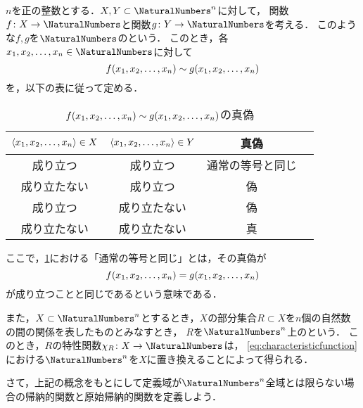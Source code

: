 \begin{Def} \label{Def:partialequal}
	\(n\)を正の整数とする．\(X, Y \subset \NaturalNumbers^n\)に対して，
	関数\(f \colon X \to \NaturalNumbers\)と関数\(g \colon Y \to \NaturalNumbers\)を考える．
	このような\(f, g\)を\(\NaturalNumbers\)のという．
	このとき，各\(x_1, x_2, \dots, x_n \in \NaturalNumbers\)に対して
	\begin{equation}
		\apply{f}{x_1, x_2, \dots, x_n} \partialequal \apply{g}{x_1, x_2, \dots, x_n}
		\label{eq:partialequal}
	\end{equation}
	を，以下の表に従って定める．

	\begin{table}[htbp]
		\centering
		\caption{\(\apply{f}{x_1, x_2, \dots, x_n} \partialequal \apply{g}{x_1, x_2, \dots, x_n}\)の真偽}
		\label{tab:partialequal}
		\begin{tabular}{cccc}
			\toprule
			\(\langle x_1, x_2, \dots, x_n \rangle \in X\) &
			\(\langle x_1, x_2, \dots, x_n \rangle \in Y\) &
			真偽                                                        \\
			\midrule
			成り立つ                                  & 成り立つ   & 通常の等号と同じ \\
			成り立たない                                & 成り立つ   & 偽        \\
			成り立つ                                  & 成り立たない & 偽        \\
			成り立たない                                & 成り立たない & 真        \\
			\bottomrule
		\end{tabular}
	\end{table}

	ここで，\cref{tab:partialequal}における「通常の等号と同じ」とは，その真偽が
	\[
		\apply{f}{x_1, x_2, \dots, x_n} = \apply{g}{x_1, x_2, \dots, x_n}
	\]
	が成り立つことと同じであるという意味である．

	また，\(X \subset \NaturalNumbers^n\)とするとき，\(X\)の部分集合\(R \subset X\)を\(n\)個の自然数の間の関係を表したものとみなすとき，
	\(R\)を\(\NaturalNumbers^n\)上のという．
	このとき，\(R\)の特性関数\(\characteristicfunction{R} \colon X \to \NaturalNumbers\)は，
	\cref{eq:characteristicfunction}における\(\NaturalNumbers^n\)を\(X\)に置き換えることによって得られる．
\end{Def}

さて，上記の概念をもとにして定義域が\(\NaturalNumbers^n\)全域とは限らない場合の帰納的関数と原始帰納的関数を定義しよう．

